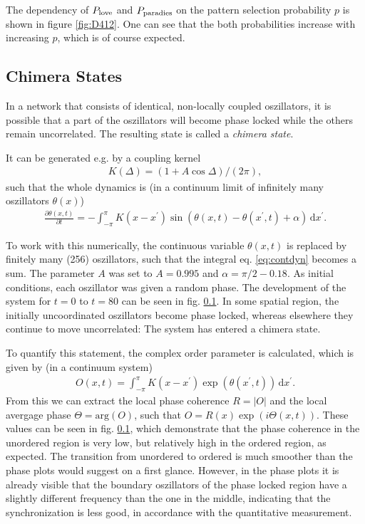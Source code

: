 \documentclass{scrartcl}
\begin{document}
The dependency of $P_{\mathrm{love}}$ and $P_{\mathrm{paradies}}$ on the pattern
selection probability $p$ is shown in figure \ref{fig:D412}. One can
see that the both probabilities increase with increasing $p$, which is
of course expected.

\subsection{Chimera States}
In a network that consists of identical, non-locally coupled oszillators, it is possible 
that a part of the oszillators will become phase locked while the others remain uncorrelated.
The resulting state is called a \emph{chimera state}.

It can be generated e.g. by a coupling kernel 
\begin{align}
K(\Delta) = (1 + A \cos{\Delta}) / (2 \pi),
\end{align}
such that the whole dynamics is (in a continuum limit of infinitely many oszillators $\theta(x)$)
\begin{align}
 \frac{\partial \theta(x, t)}{\partial t} = - \int_{-\pi}^{\pi} K(x-x^\prime) \sin \left( \theta(x, t) - \theta(x^\prime, t) + \alpha \right) \, \mathrm{d} x^\prime. \label{eq:contdyn}
\end{align}

To work with this numerically, the continuous variable $\theta(x, t)$ is replaced by finitely many (256) oszillators, such that the integral eq. \ref{eq:contdyn} becomes a sum. The parameter $A$ was set to $A= 0.995$ and $\alpha = \pi/2 - 0.18$. As initial conditions, each oszillator was given a random phase. 
The development of the system for $t=0$ to $t=80$ can be seen in fig. \ref{}.
In some spatial region, the initially uncoordinated oszillators become phase locked, whereas elsewhere they continue to move uncorrelated: The system has entered a chimera state.

To quantify this statement, the complex order parameter is calculated, which is given by (in a continuum system)
\begin{align}
 O(x, t) = \int_{-\pi}^{\pi} K(x-x^\prime) \exp( \theta(x^\prime, t)) \, \mathrm{d} x^\prime. \label{eq:orderparameter}
\end{align} 
From this we can extract the local phase coherence $R = |O|$ and the local avergage phase $\Theta = \mathrm{arg}(O)$, such that
$O = R(x) \exp( i \Theta(x, t) )$. 
These values can be seen in fig. \ref{}, which demonstrate that the phase coherence in the unordered region is very low, but relatively high in the ordered region, as expected. 
The transition from unordered to ordered is much smoother than the phase plots would suggest on a first glance.
However, in the phase plots it is already visible that the boundary oszillators of the phase locked region have a slightly different frequency than the one in the middle, indicating that the synchronization is less good, in accordance with the quantitative measurement.
\end{document}
